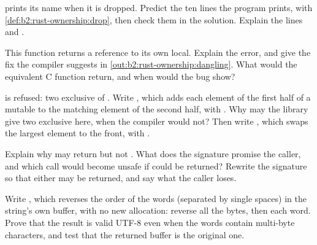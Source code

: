 \begin{exercise}[$\star\star$]\label{exo:b2:rust-ownership:5}
 prints its name when it is dropped. Predict the ten lines the program prints, with
\cref{def:b2:rust-ownership:drop}, then check them in the solution. Explain the lines  and
.
\end{exercise}

\begin{exercise}[$\star\star$]\label{exo:b2:rust-ownership:6}
This function returns a reference to its own local. Explain the error, and give the fix the compiler suggests in
\cref{out:b2:rust-ownership:dangling}. What would the equivalent C function return, and when would the bug show?
\end{exercise}

\begin{exercise}[$\star\star$]\label{exo:b2:rust-ownership:7}
 is refused: two exclusive  of . Write ,
which adds each element of the first half of a mutable  to the matching element of the second half, with
. Why may the library give two exclusive  here, when the compiler would not? Then write
, which swaps the largest element to the front, with .
\end{exercise}

\begin{exercise}[$\star\star$]\label{exo:b2:rust-ownership:8}
Explain why  may return  but not . What does the
signature promise the caller, and which call would become unsafe if  could be returned? Rewrite the
signature so that either may be returned, and say what the caller loses.
\end{exercise}

\begin{exercise}[$\star\star$]\label{exo:b2:rust-ownership:9}
Write , which reverses the order of the words (separated by single
spaces) in the string's own buffer, with no new allocation: reverse all the bytes, then each word. Prove that the
result is valid UTF-8 even when the words contain multi-byte characters, and test that the returned buffer is the
original one.
\end{exercise}

